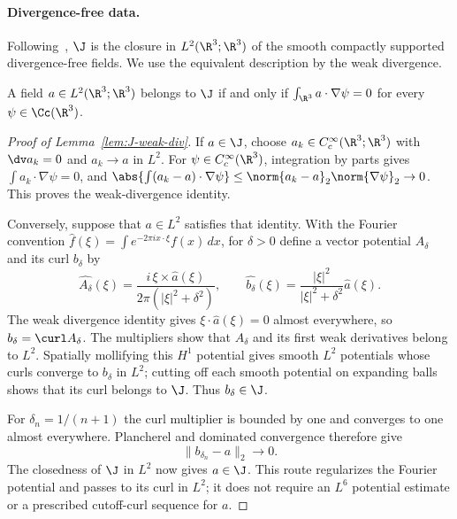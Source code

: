 \documentclass[11pt,reqno]{amsart}
\begin{document}
\paragraph{Divergence-free data.}
Following~\cite{ESS2003}, $\J$ is the closure in $L^2(\R^3;\R^3)$ of the
smooth compactly supported divergence-free fields. We use the equivalent
description by the weak divergence.

\begin{lemma}\label{lem:J-weak-div}
A field $a\in L^2(\R^3;\R^3)$ belongs to $\J$ if and only if
$\int_{\R^3}a\cdot\nabla\psi=0$ for every $\psi\in\Cc(\R^3)$.
\end{lemma}
\begin{proof}[Proof of Lemma~\ref{lem:J-weak-div}]
If $a\in\J$, choose $a_k\in C_c^\infty(\R^3;\R^3)$ with
$\dv a_k=0$ and $a_k\to a$ in $L^2$. For $\psi\in C_c^\infty(\R^3)$,
integration by parts gives $\int a_k\cdot\nabla\psi=0$, and
$\abs{\int(a_k-a)\cdot\nabla\psi}\le
\norm{a_k-a}_2
\norm{\nabla\psi}_2\to0$. This proves the weak-divergence
identity.

Conversely, suppose that $a\in L^2$ satisfies that identity. With the
Fourier convention $\widehat f(\xi)=\int e^{-2\pi i x\cdot\xi}f(x)\,dx$,
for $\delta>0$ define a vector potential $A_\delta$ and its curl $b_\delta$
by
\begin{equation}\label{eq:J-vector-potential}
 \widehat{A_\delta}(\xi)=
   \frac{i\,\xi\times\widehat a(\xi)}{2\pi(|\xi|^2+\delta^2)},
 \qquad
 \widehat{b_\delta}(\xi)=
   \frac{|\xi|^2}{|\xi|^2+\delta^2}\widehat a(\xi).
\end{equation}
The weak divergence identity gives $\xi\cdot\widehat a(\xi)=0$ almost
everywhere, so $b_\delta=\curl A_\delta$. The multipliers show that
$A_\delta$ and its first weak derivatives belong to $L^2$. Spatially
mollifying this $H^1$ potential gives smooth $L^2$ potentials whose curls
converge to $b_\delta$ in $L^2$; cutting off each smooth potential on
expanding balls shows that its curl belongs to $\J$. Thus $b_\delta\in\J$.

For $\delta_n=1/(n+1)$ the curl multiplier is bounded by one and converges
to one almost everywhere. Plancherel and dominated convergence therefore give
\begin{equation}\label{eq:J-cutoff-convergence}
 \|b_{\delta_n}-a\|_2\longrightarrow0.
\end{equation}
The closedness of $\J$ in $L^2$ now gives $a\in\J$. This route regularizes
the Fourier potential and passes to its curl in $L^2$; it does not require an
$L^6$ potential estimate or a prescribed cutoff-curl sequence for $a$.
\end{proof}
\end{document}
